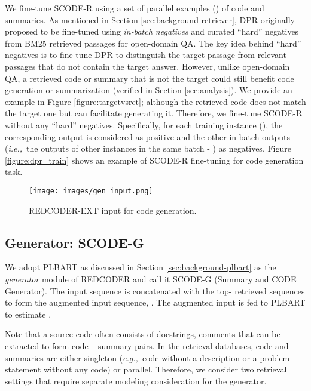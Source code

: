 \documentclass[11pt]{article}
\newcommand{\tool}{{REDCODER}\xspace}
\newcommand{\toolext}{{REDCODER-EXT}\xspace}
\newcommand{\coder}{SCODE-R\xspace}
\newcommand{\eg}{\textit{e.g.,}~}
\newcommand{\ie}{\textit{i.e.,}~}
\begin{document}
We fine-tune \coder using a set of parallel examples () of code and summaries.
As mentioned in Section \ref{sec:background-retriever}, DPR originally proposed to be fine-tuned using \emph{in-batch negatives} and curated ``hard'' negatives from BM25 retrieved passages for open-domain QA. 
The key idea behind ``hard'' negatives is to fine-tune DPR to distinguish the target passage from relevant passages that do not contain the target answer.
However, unlike open-domain QA, a retrieved code or summary that is not the target could still benefit code generation or summarization (verified in Section \ref{sec:analysis}).
We provide an example in Figure \ref{figure:targetvsret}; although the retrieved code does not match the target one but can facilitate generating it.
Therefore, we fine-tune \coder without any ``hard'' negatives. 
Specifically, for each training instance (), the corresponding output  is considered as positive and the other in-batch outputs (\ie the outputs of other instances in the same batch - ) as negatives.
Figure \ref{figure:dpr_train} shows an example of \coder fine-tuning for code generation task. 



\begin{figure}[t]
\captionsetup[subfigure]{labelformat=empty}
\centering
\hspace*{-3pt}
\texttt{[image: images/gen\_input.png]}
\caption{\toolext input for code generation. }
\vspace{-2mm}
\label{figure:gen_input}
\end{figure}


\subsection{Generator: SCODE-G}
\label{sec:method:gen}
We adopt PLBART as discussed in Section \ref{sec:background-plbart} as the {\em generator} module of \tool and call it SCODE-G (Summary and CODE Generator).
The input sequence  is concatenated with the top- retrieved sequences 
to form the augmented input sequence, .
The augmented input  is fed to PLBART to estimate .


Note that a source code often consists of docstrings, comments that can be extracted to form code -- summary pairs.
In the retrieval databases, code and summaries are either singleton (\eg code without a description or a problem statement without any code) or parallel.
Therefore, we consider two retrieval settings that require separate modeling consideration for the generator.
\end{document}
